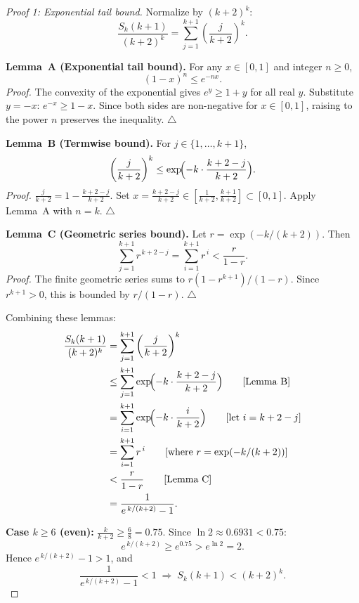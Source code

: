 \documentclass[12pt,a4paper]{article}
\theoremstyle{plain}
\theoremstyle{definition}
\begin{document}
\begin{proof}[Proof 1: Exponential tail bound]
  Normalize by $(k+2)^k$:
  \[
    \frac{S_k(k+1)}{(k+2)^k}
    = \sum_{j=1}^{k+1} \left(\frac{j}{k+2}\right)^k.
  \]

  \medskip
  \noindent\textbf{Lemma~A (Exponential tail bound).}
  For any $x \in [0, 1]$ and integer $n \ge 0$,
  \[
    (1 - x)^n \le e^{-nx}.
  \]
  \textit{Proof.} The convexity of the exponential gives $e^y \ge 1 + y$
  for all real $y$.  Substitute $y = -x$: $e^{-x} \ge 1 - x$.
  Since both sides are non-negative for $x \in [0,1]$, raising to the
  power $n$ preserves the inequality.  \hfill$\triangle$

  \medskip
  \noindent\textbf{Lemma~B (Termwise bound).}
  For $j \in \{1, \dots, k+1\}$,
  \[
    \left(\frac{j}{k+2}\right)^k
    \le \exp\!\Bigl(-k \cdot \frac{k+2-j}{k+2}\Bigr).
  \]
  \textit{Proof.} $\frac{j}{k+2} = 1 - \frac{k+2-j}{k+2}$.
  Set $x = \frac{k+2-j}{k+2} \in [\frac{1}{k+2}, \frac{k+1}{k+2}] \subset [0,1]$.
  Apply Lemma~A with $n = k$.  \hfill$\triangle$

  \medskip
  \noindent\textbf{Lemma~C (Geometric series bound).}
  Let $r = \exp(-k/(k+2))$.  Then
  \[
    \sum_{j=1}^{k+1} r^{\,k+2-j}
    = \sum_{i=1}^{k+1} r^{\,i}
    < \frac{r}{1-r}.
  \]
  \textit{Proof.} The finite geometric series sums to
  $r(1 - r^{k+1})/(1-r)$.  Since $r^{k+1} > 0$, this is bounded by
  $r/(1-r)$.  \hfill$\triangle$

  \medskip
  Combining these lemmas:
  \begin{align*}
    \frac{S_k(k+1)}{(k+2)^k}
    &= \sum_{j=1}^{k+1} \left(\frac{j}{k+2}\right)^k \\
    &\le \sum_{j=1}^{k+1}
       \exp\!\Bigl(-k \cdot \frac{k+2-j}{k+2}\Bigr)
       \qquad\text{[Lemma~B]} \\
    &= \sum_{i=1}^{k+1} \exp\!\Bigl(-k \cdot \frac{i}{k+2}\Bigr)
       \qquad\text{[let $i = k+2-j$]} \\
    &= \sum_{i=1}^{k+1} r^{\,i}
       \qquad\text{[where $r = \exp(-k/(k+2))$]} \\
    &< \frac{r}{1-r}
       \qquad\text{[Lemma~C]} \\
    &= \frac{1}{e^{\,k/(k+2)} - 1}.
  \end{align*}

  \medskip
  \noindent\textbf{Case $k \ge 6$ (even):}
  $\frac{k}{k+2} \ge \frac{6}{8} = 0.75$.
  Since $\ln 2 \approx 0.6931 < 0.75$:
  \[
    e^{\,k/(k+2)} \ge e^{0.75} > e^{\ln 2} = 2.
  \]
  Hence $e^{\,k/(k+2)} - 1 > 1$, and
  \[
    \frac{1}{e^{\,k/(k+2)} - 1} < 1
    \;\Longrightarrow\;
    S_k(k+1) < (k+2)^k.
  \]


\end{proof}
\end{document}
